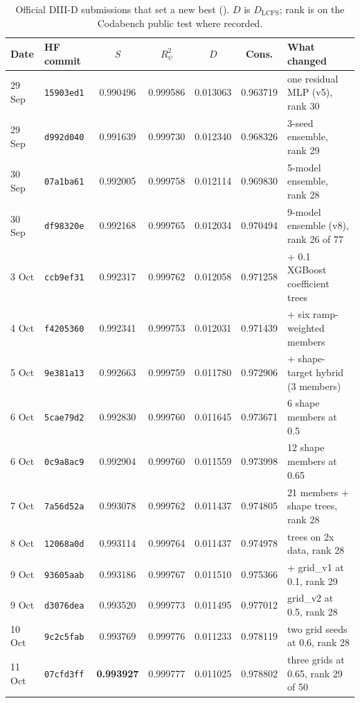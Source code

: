 \documentclass{article}
\newcommand{\sha}[1]{\texttt{#1}}
\newcommand{\file}[1]{\texttt{\detokenize{#1}}}
\begin{document}
\begin{table}[h]
\centering
\caption{Official DIII-D submissions that set a new best (\file{results/codabench.json}). $D$ is
$D_{\mathrm{LCFS}}$; rank is on the Codabench public test where recorded.}
\label{tab:official}
\footnotesize
\setlength{\tabcolsep}{4pt}
\begin{tabular}{llccccl}
\toprule
Date & HF commit & $S$ & $R^2_\psi$ & $D$ & Cons. & What changed \\
\midrule
29 Sep & \sha{15903ed1} & 0.990496 & 0.999586 & 0.013063 & 0.963719 & one residual MLP (v5), rank 30 \\
29 Sep & \sha{d992d040} & 0.991639 & 0.999730 & 0.012340 & 0.968326 & 3-seed ensemble, rank 29 \\
30 Sep & \sha{07a1ba61} & 0.992005 & 0.999758 & 0.012114 & 0.969830 & 5-model ensemble, rank 28 \\
30 Sep & \sha{df98320e} & 0.992168 & 0.999765 & 0.012034 & 0.970494 & 9-model ensemble (v8), rank 26 of 77 \\
3 Oct & \sha{ccb9ef31} & 0.992317 & 0.999762 & 0.012058 & 0.971258 & + 0.1 XGBoost coefficient trees \\
4 Oct & \sha{f4205360} & 0.992341 & 0.999753 & 0.012031 & 0.971439 & + six ramp-weighted members \\
5 Oct & \sha{9e381a13} & 0.992663 & 0.999759 & 0.011780 & 0.972906 & + shape-target hybrid (3 members) \\
6 Oct & \sha{5cae79d2} & 0.992830 & 0.999760 & 0.011645 & 0.973671 & 6 shape members at 0.5 \\
6 Oct & \sha{0c9a8ac9} & 0.992904 & 0.999760 & 0.011559 & 0.973998 & 12 shape members at 0.65 \\
7 Oct & \sha{7a56d52a} & 0.993078 & 0.999762 & 0.011437 & 0.974805 & 21 members + shape trees, rank 28 \\
8 Oct & \sha{12068a0d} & 0.993114 & 0.999764 & 0.011437 & 0.974978 & trees on 2x data, rank 28 \\
9 Oct & \sha{93605aab} & 0.993186 & 0.999767 & 0.011510 & 0.975366 & + grid\_v1 at 0.1, rank 29 \\
9 Oct & \sha{d3076dea} & 0.993520 & 0.999773 & 0.011495 & 0.977012 & grid\_v2 at 0.5, rank 28 \\
10 Oct & \sha{9c2c5fab} & 0.993769 & 0.999776 & 0.011233 & 0.978119 & two grid seeds at 0.6, rank 28 \\
11 Oct & \sha{07cfd3ff} & \textbf{0.993927} & 0.999777 & 0.011025 & 0.978802 & three grids at 0.65, rank 29 of 50 \\
\bottomrule
\end{tabular}
\end{table}
\end{document}
